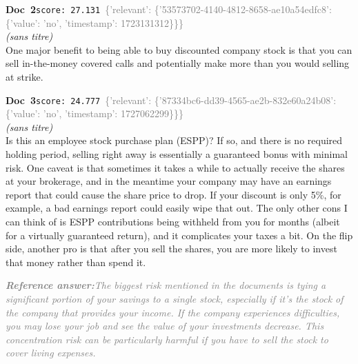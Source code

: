 \documentclass[a4paper,11pt]{article}
\begin{document}
\begin{docenv}
{\footnotesize\textcolor{doccolor}{\textbf{Doc~2}}}\hfill{\tiny\texttt{score:~27.131}}\ {\tiny\textcolor{gray}{\{'relevant': \{'53573702-4140-4812-8658-ae10a54edfc8': \{'value': 'no', 'timestamp': 1723131312\}\}\}}}\\[3pt]
{\small\textit{(sans titre)}}\\[2pt]
\vspace{2pt}
{\footnotesize 
One major benefit to being able to buy discounted company stock is that you can sell in-the-money covered calls and potentially make more than you would selling at strike.}
\end{docenv}
\begin{docenv}
{\footnotesize\textcolor{doccolor}{\textbf{Doc~3}}}\hfill{\tiny\texttt{score:~24.777}}\ {\tiny\textcolor{gray}{\{'relevant': \{'87334bc6-dd39-4565-ae2b-832e60a24b08': \{'value': 'no', 'timestamp': 1727062299\}\}\}}}\\[3pt]
{\small\textit{(sans titre)}}\\[2pt]
\vspace{2pt}
{\footnotesize 
Is this an employee stock purchase plan (ESPP)? If so, and there is no required holding period, selling right away is essentially a guaranteed bonus with minimal risk. One caveat is that sometimes it takes a while to actually receive the shares at your brokerage, and in the meantime your company may have an earnings report that could cause the share price to drop. If your discount is only 5\%, for example, a bad earnings report could easily wipe that out. The only other cons I can think of is ESPP contributions being withheld from you for months (albeit for a virtually guaranteed return), and it complicates your taxes a bit. On the flip side, another pro is that after you sell the shares, you are more likely to invest that money rather than spend it.}
\end{docenv}
\begin{refanswerenv}
{\footnotesize\textit{\textcolor{gray}{\textbf{Reference answer:}\enspace The biggest risk mentioned in the documents is tying a significant portion of your savings to a single stock, especially if it's the stock of the company that provides your income. If the company experiences difficulties, you may lose your job and see the value of your investments decrease. This concentration risk can be particularly harmful if you have to sell the stock to cover living expenses.}}}
\end{refanswerenv}
\vspace{0.5em}
\end{document}
